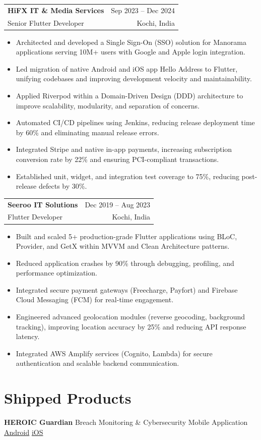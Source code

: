 \documentclass[letterpaper,10pt]{article}
\makeatletter
\newcommand{\role}[4]{
  \vspace{2pt}
  \noindent\begin{tabular*}{\textwidth}{l@{\extracolsep{\fill}}r}
    \textbf{#1} & #2 \\
    #3 & #4 \\
  \end{tabular*}
  \vspace{-6pt}
}
\newcommand{\project}[2]{
  \noindent\textbf{#1} \hspace{2pt}\textemdash\hspace{2pt} #2
  \vspace{1pt}
}
\makeatother
\begin{document}
\role{HiFX IT \& Media Services}{Sep 2023 -- Dec 2024}{Senior Flutter Developer}{Kochi, India}
\begin{itemize}
  \item Architected and developed a Single Sign-On (SSO) solution for Manorama applications serving 10M+ users with Google and Apple login integration.
  \item Led migration of native Android and iOS app Hello Address to Flutter, unifying codebases and improving development velocity and maintainability.
  \item Applied Riverpod within a Domain-Driven Design (DDD) architecture to improve scalability, modularity, and separation of concerns.
  \item Automated CI/CD pipelines using Jenkins, reducing release deployment time by 60\% and eliminating manual release errors.
  \item Integrated Stripe and native in-app payments, increasing subscription conversion rate by 22\% and ensuring PCI-compliant transactions.
  \item Established unit, widget, and integration test coverage to 75\%, reducing post-release defects by 30\%.
\end{itemize}

\role{Seeroo IT Solutions}{Dec 2019 -- Aug 2023}{Flutter Developer}{Kochi, India}
\begin{itemize}
  \item Built and scaled 5+ production-grade Flutter applications using BLoC, Provider, and GetX within MVVM and Clean Architecture patterns.
  \item Reduced application crashes by 90\% through debugging, profiling, and performance optimization.
  \item Integrated secure payment gateways (Freecharge, Payfort) and Firebase Cloud Messaging (FCM) for real-time engagement.
  \item Engineered advanced geolocation modules (reverse geocoding, background tracking), improving location accuracy by 25\% and reducing API response latency.
  \item Integrated AWS Amplify services (Cognito, Lambda) for secure authentication and scalable backend communication.
\end{itemize}

\section*{Shipped Products}
\vspace{2pt}
\project{HEROIC Guardian}{Breach Monitoring \& Cybersecurity Mobile Application \quad \textcolor{blue}{\href{https://play.google.com/store/apps/details?id=com.heroic.application}{Android}} \quad \textcolor{blue}{\href{https://apps.apple.com/ae/app/heroic-guardian/id6741095916}{iOS}}}
\end{document}
